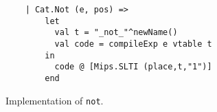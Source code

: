 \begin{figure}
    \centering
    \begin{lstlisting}
    | Cat.Not (e, pos) =>
        let
          val t = "_not_"^newName()
          val code = compileExp e vtable t
        in
          code @ [Mips.SLTI (place,t,"1")]
        end
    \end{lstlisting}
    \caption{Implementation of \texttt{not}.}
    \label{fig:compiler:not}
\end{figure}


